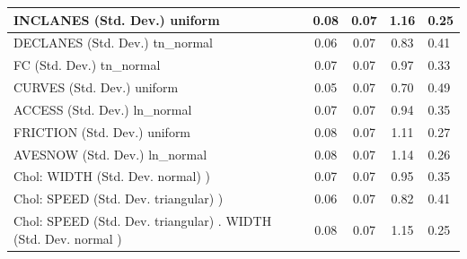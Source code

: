 \begin{table}
\begin{center}
\begin{tabular}{|l|l|c|c|c|l|}
			\hline
			INCLANES (Std. Dev.) uniform &  & 0.08 & 0.07 & 1.16 & 0.25 \\
			\hline
			DECLANES (Std. Dev.) tn_normal &  & 0.06 & 0.07 & 0.83 & 0.41 \\
			\hline
			FC (Std. Dev.) tn_normal &  & 0.07 & 0.07 & 0.97 & 0.33 \\
			\hline
			CURVES (Std. Dev.) uniform &  & 0.05 & 0.07 & 0.70 & 0.49 \\
			\hline
			ACCESS (Std. Dev.) ln_normal &  & 0.07 & 0.07 & 0.94 & 0.35 \\
			\hline
			FRICTION (Std. Dev.) uniform &  & 0.08 & 0.07 & 1.11 & 0.27 \\
			\hline
			AVESNOW (Std. Dev.) ln_normal &  & 0.08 & 0.07 & 1.14 & 0.26 \\
			\hline
			 Chol: WIDTH (Std. Dev. normal) ) &  & 0.07 & 0.07 & 0.95 & 0.35 \\
			\hline
			 Chol: SPEED (Std. Dev. triangular) ) &  & 0.06 & 0.07 & 0.82 & 0.41 \\
			\hline
			 Chol: SPEED (Std. Dev. triangular) . WIDTH (Std. Dev.   normal ) &  & 0.08 & 0.07 & 1.15 & 0.25 \\
			\hline
		\end{tabular}
	\end{center}
\end{table}